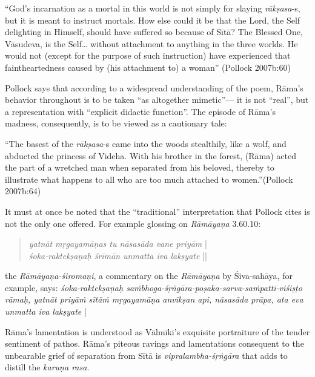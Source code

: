 \begin{myquote}
“God's incarnation as a mortal in this world is not simply for slaying {\sl rākṣasa}-s, but it is meant to instruct mortals. How else could it be that the Lord, the Self delighting in Himself, should have suffered so because of Sītā? The Blessed One, Vāsudeva, is the Self… without attachment to anything in the three worlds. He would not (except for the purpose of such instruction) have experienced that faintheartedness caused by (his attachment to) a woman” (Pollock 2007b:60)
\end{myquote}

\newpage

Pollock says that according to a widespread understanding of the poem, Rāma’s behavior throughout is to be taken “as altogether mimetic”--- it is not “real”, but a representation with “explicit didactic function”. The episode of Rāma’s madness, consequently, is to be viewed as a cautionary tale:

\begin{myquote}
“The basest of the {\sl rākṣasa}-s came into the woods stealthily, like a wolf, and abducted the princess of Videha. With his brother in the forest, (Rāma) acted the part of a wretched man when separated from his beloved, thereby to illustrate what happens to all who are too much attached to women.”\hfill (Pollock 2007b:64)
\end{myquote}

It must at once be noted that the “traditional” interpretation that Pollock cites is not the only one offered. For example glossing on {\sl Rāmāyaṇa} 3.60.10:\\[-20pt] 
\begin{quote}
{{\sl yatnāt mṛgayamāṇas tu nāsasāda vane priyām}}\label{verse42} |\\
{\sl śoka-raktekṣaṇaḥ śrīmān unmatta iva lakṣyate} ||\\[-20pt]  
\end{quote}
the {\sl Rāmāyaṇa-śiromaṇi}, a commentary on the {\sl Rāmāyaṇa} by Śiva-sahāya, for example, says: {\sl śoka-raktekṣaṇaḥ saṁbhoga-śṛṅgāra-poṣaka-sarva-saṁpatti-viśiṣṭo rāmaḥ, yatnāt priyāṁ sītāṁ mṛgaya\-māṇa anvīkṣan api, nāsasāda prāpa, ata eva unmatta iva lakṣyate} |  

Rāma’s lamentation is understood as Vālmīki’s exquisite portraiture of the tender sentiment of pathos. Rāma’s piteous ravings and lamentations consequent to the unbearable grief of separation from Sītā is {\sl vipralambha-śṛṅgāra} that adds to distill the {\sl karuṇa rasa}. 

